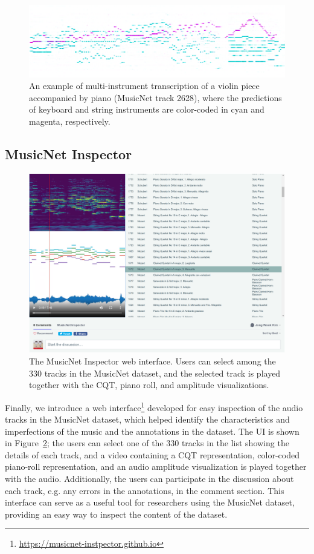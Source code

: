 \begin{figure}
	\centering
	\includegraphics[width=\textwidth]{2628.png}
	\caption{An example of multi-instrument transcription of a violin piece accompanied by piano (MusicNet track 2628), where the predictions of keyboard and string instruments are color-coded in cyan and magenta, respectively. }\label{fig:multi-instrument-example}
\end{figure}

\subsection{MusicNet Inspector}

\begin{figure}[t]
\includegraphics[width=\textwidth]{inspector.png}
\caption{The MusicNet Inspector web interface. Users can select among the 330 tracks in the MusicNet dataset, and the selected track is played together with the CQT, piano roll, and amplitude visualizations.}\label{fig:musicnet-inspector}
\end{figure}

Finally, we introduce a web interface\footnote{\url{https://musicnet-instpector.github.io}} developed for easy inspection of the audio tracks in the MusicNet dataset, which helped identify the characteristics and imperfections of the music and the annotations in the dataset.
The UI is shown in Figure~\ref{fig:musicnet-inspector}; the users can select one of the 330 tracks in the list showing the details of each track, and a video containing a CQT representation, color-coded piano-roll representation, and an audio amplitude visualization is played together with the audio.
Additionally, the users can participate in the discussion about each track, e.g. any errors in the annotations, in the comment section.
This interface can serve as a useful tool for researchers using the MusicNet dataset, providing an easy way to inspect the content of the dataset.


